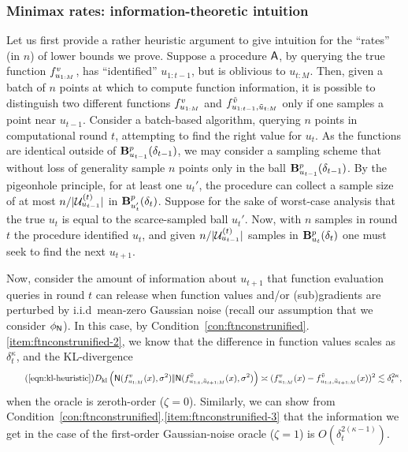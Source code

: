 \subsubsection{Minimax rates: information-theoretic intuition}
Let us first provide a rather heuristic argument to give intuition for the ``rates'' (in $n$) of lower bounds we prove.
Suppose a procedure $\mathsf{A}$, by querying the true function $f_{u_{1:M}}^v$, has
``identified'' $u_{1:t-1}$, but is oblivious to $u_{t:M}$.
Then, given a batch of $n$ points at which to compute function information, it is possible to
distinguish two different functions $f_{u_{1:M}}^v$ and $f_{u_{1:t-1}, \tilde u_{t:M}}^{\tilde v}$ only if one samples a point near
$u_{t-1}$.
Consider a batch-based algorithm, querying $n$ points in computational round $t$,
attempting to find the right value for $u_t$.
As the functions are identical outside of
$\mathbf{B}^p_{u_{t-1}}({\delta_{t-1}})$, we may consider a sampling scheme that without
loss of generality sample $n$ points only in the ball $\mathbf{B}^p_{u_{t-1}}({\delta_{t-1}})$.
By the pigeonhole principle, for at least one $u_t'$, the procedure can
collect a sample size of at most $n / |\mathcal{U}^{({t})}_{u_{t-1}}|$ in $\mathbf{B}^p_{u_t'}({\delta_t})$.
Suppose for the sake of worst-case analysis that the true $u_t$ is equal to the scarce-sampled ball $u_t'$. Now, with $n$ samples in round $t$ the procedure identified $u_t$, and given $n / |\mathcal{U}^{({t})}_{u_{t-1}}|$ samples in $\mathbf{B}^p_{u_{t}}({\delta_{t}})$ one must seek to find the next $u_{t+1}$.

Now, consider the amount of information about $u_{t+1}$ that function evaluation queries in round $t$ can release when function values and/or (sub)gradients are perturbed by i.i.d\ mean-zero Gaussian noise (recall our assumption that we consider $\phi_{\mathsf{N}}$). In this case, by Condition~\ref{con:ftnconstrunified}.\ref{item:ftnconstrunified-2}, we know that the difference in function values scales as $\delta_{t}^\kappa$,
and the KL-divergence
\begin{equation}
\tag{\ref{eqn:kl-heuristic}}
\dkl{\normal(\ftnuv(x), \sigma^2)}{
	\normal(\ftnuvtildetpone(x), \sigma^2)}
\asymp (\ftnuv(x) - \ftnuvtildetpone(x))^2 
\lesssim \delta_{t}^{2\kappa},
\end{equation}
when the oracle is zeroth-order ($\zeta = 0$). Similarly, we can show from Condition~\ref{con:ftnconstrunified}.\ref{item:ftnconstrunified-3} that the information we get in the case of the first-order Gaussian-noise oracle ($\zeta = 1$) is $O(\delta_{t}^{2(\kappa-1)})$.

